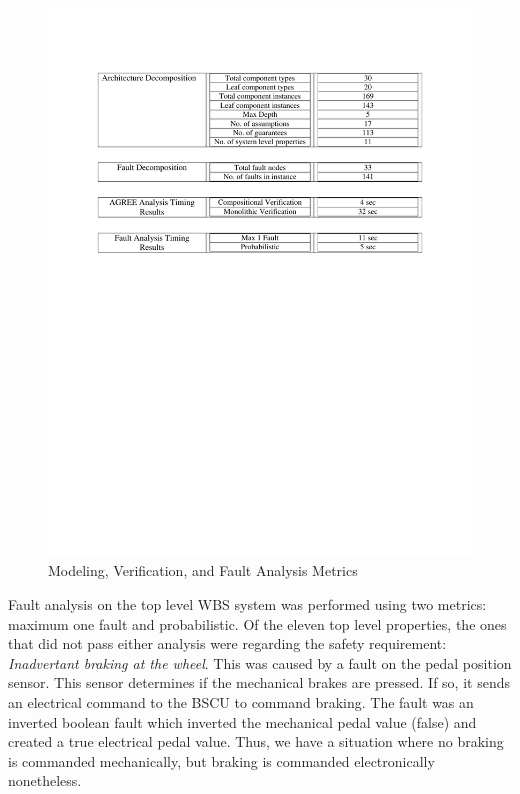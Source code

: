 \begin{figure}[h!]
	\vspace{-0.17in}
	\begin{center}
		\includegraphics[trim=0 435 0 90,clip,width=1.0\textwidth]{images/arch_table.pdf}
		\caption{Modeling, Verification, and Fault Analysis Metrics}
 		\label{fig:metrics}
	\end{center}
	\vspace{-0.40in}
\end{figure}

Fault analysis on the top level WBS system was performed using two metrics: maximum one fault and probabilistic. Of the eleven top level properties, the ones that did not pass either analysis were regarding the safety requirement: \textit{Inadvertant braking at the wheel}. This was caused by a fault on the pedal position sensor. This sensor determines if the mechanical brakes are pressed. If so, it sends an electrical command to the BSCU to command braking. The fault was an inverted boolean fault which inverted the mechanical pedal value (false) and created a true electrical pedal value. Thus, we have a situation where no  braking is commanded mechanically, but braking is commanded electronically nonetheless. 


